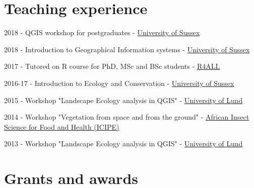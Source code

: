 \documentclass[12pt,a4paper,serif]{moderncv}        %
\begin{document}
\section{Teaching experience}

\begin{bibenum}

     \item[] 2018 - QGIS workshop for postgraduates - \href{http://sussex.ac.uk/}{University of Sussex}
     
     \item[] 2018 - Introduction to Geographical Information systems - \href{http://sussex.ac.uk/}{University of Sussex}

     \item[] 2017 - Tutored on R course for PhD, MSc and BSc students - \href{http://www.r4all.org/}{R4ALL}
     
     \item[] 2016-17 - Introduction to Ecology and Conservation - \href{http://sussex.ac.uk/}{University of Sussex}

     \item[] 2015 - Workshop "Landscape Ecology analysis in QGIS" - \href{http://www.lunduniversity.lu.se/}{University of Lund}

     \item[] 2014 - Workshop "Vegetation from space and from the ground" - \href{http://www.icipe.org/}{African Insect Science for Food and Health (ICIPE)}

     \item[] 2013 - Workshop "Landscape Ecology analysis in QGIS" - \href{http://www.lunduniversity.lu.se/}{University of Lund}

\end{bibenum}

\vspace{8pt}

\section{Grants and awards}
\end{document}
